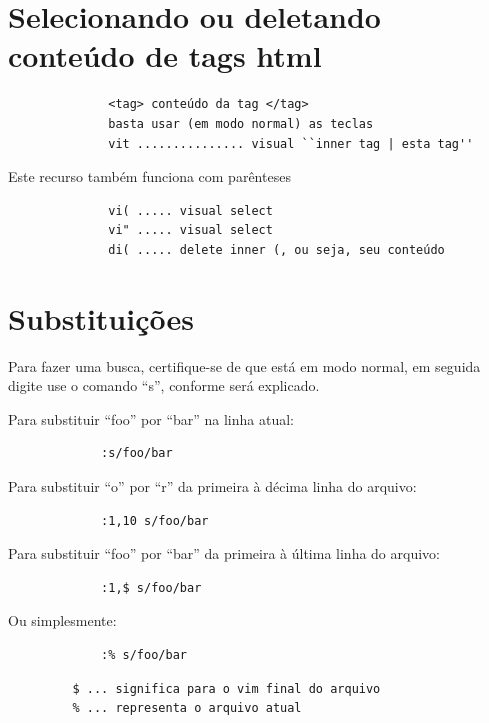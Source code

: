 \documentclass[10pt,a4paper,openany]{book}
\begin{document}
\section{Selecionando ou deletando conteúdo de tags html}
\label{Selecionando ou deletando conteúdo de tags html}

\begin{verbatim}
			  <tag> conteúdo da tag </tag>
			  basta usar (em modo normal) as teclas
			  vit ............... visual ``inner tag | esta tag''
\end{verbatim}

Este recurso também funciona com parênteses

\begin{verbatim}
			  vi( ..... visual select
			  vi" ..... visual select
			  di( ..... delete inner (, ou seja, seu conteúdo
\end{verbatim}


\section{Substituições }
\label{Substituições }

Para fazer uma busca, certifique-se de que está em modo normal, em
seguida digite use o comando ``s'', conforme será explicado.

Para substituir ``foo'' por ``bar'' na linha atual:

\begin{verbatim}
			 :s/foo/bar
\end{verbatim}

Para substituir ``o'' por ``r'' da primeira à décima linha do arquivo:

\begin{verbatim}
			 :1,10 s/foo/bar
\end{verbatim}

Para substituir ``foo'' por ``bar'' da primeira à última linha do arquivo:

\begin{verbatim}
			 :1,$ s/foo/bar
\end{verbatim}

Ou simplesmente:

\begin{verbatim}
			 :% s/foo/bar
\end{verbatim}

\begin{verbatim}
		 $ ... significa para o vim final do arquivo
		 % ... representa o arquivo atual
\end{verbatim}
\end{document}
